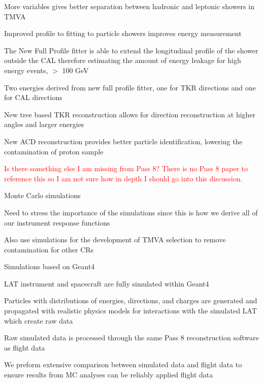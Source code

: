 \documentclass{article}
\begin{document}
\begin{myEnumerate}
\begin{myEnumerate}
\begin{myEnumerate}
				\end{myEnumerate}
				\item More variables gives better separation between hadronic and leptonic showers in TMVA
				\item Improved profile to fitting to particle showers improves energy measurement
				\begin{myEnumerate}
					\item The New Full Profile fitter is able to extend the longitudinal profile of the shower outside the CAL therefore estimating the amount of energy leakage for high energy events, $>$ 100 GeV
					\item Two energies derived from new full profile fitter, one for TKR directions and one for CAL directions
				\end{myEnumerate}
				\item New tree based TKR reconstruction allows for direction reconstruction at higher angles and larger energies
				\item New ACD reconstruction provides better particle identification, lowering the contamination of proton sample
				\item \textcolor{red}{Is there something else I am missing from Pass 8?  There is no Pass 8 paper to reference this so I am not sure how in depth I should go into this discussion.}
			\end{myEnumerate}
		\item Monte Carlo simulations
			\begin{myEnumerate}
				\item Need to stress the importance of the simulations since this is how we derive all of our instrument response functions 
				\item Also use simulations for the development of TMVA selection to remove contamination for other CRs
				\item Simulations based on Geant4
				\item LAT instrument and spacecraft are fully simulated within Geant4
				\item Particles with distributions of energies, directions, and charges are generated and propagated with realistic physics models for interactions with the simulated LAT which create raw data
				\item Raw simulated data is processed through the same Pass 8 reconstruction software as flight data
				\item We preform extensive comparison between simulated data and flight data to ensure results from MC analyses can be reliably applied flight data

\end{myEnumerate}
\end{myEnumerate}
\end{document}
